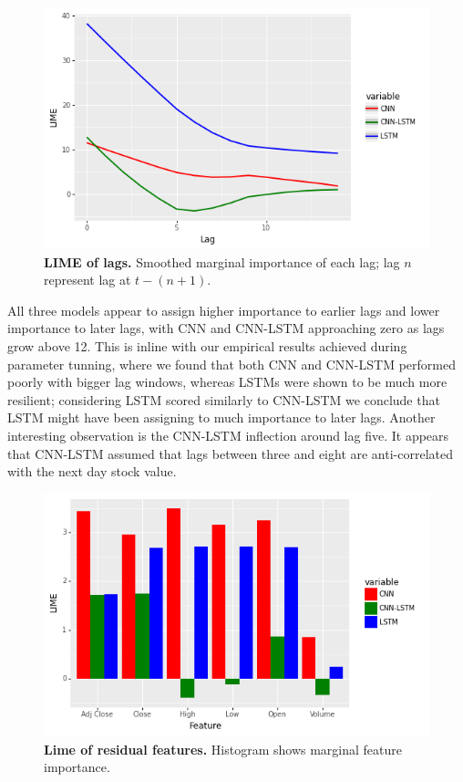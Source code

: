 \documentclass[12pt,journal,compsoc]{IEEEtran}
\begin{document}
\begin{figure}[!ht]\centering
	\includegraphics[width=\linewidth]{images/fig4.png}
	\caption{\textbf{LIME of lags.} Smoothed marginal importance of each lag; lag $n$ represent lag at $t-(n+1)$.}
	\label{fig:expl2}
\end{figure}
\par All three models appear to assign higher importance to earlier lags and lower importance to later lags, with CNN and CNN-LSTM approaching zero as lags grow above 12. 
This is inline with our empirical results achieved during parameter tunning, where we found that both CNN and CNN-LSTM performed poorly with bigger lag windows, whereas LSTMs were shown to be much more resilient; considering LSTM scored similarly to CNN-LSTM we conclude that LSTM might have been assigning to much importance to later lags.
Another interesting observation is the CNN-LSTM inflection around lag five. It appears that CNN-LSTM assumed that lags between three and eight are anti-correlated with the next day stock value.
\begin{figure}[!ht]\centering
	\includegraphics[width=\linewidth]{images/fig5.png}
	\caption{\textbf{Lime of residual features.} Histogram shows marginal feature importance.}
	\label{fig:expl5}
\end{figure}
\end{document}
